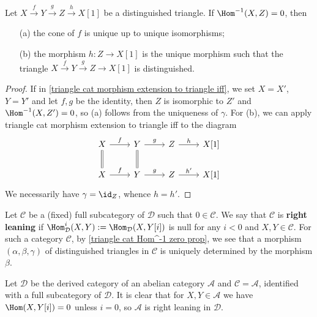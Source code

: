 \begin{corollary}\label{triangle cat Hom^-1 zero prop}
Let $X\stackrel{f}{\to} Y\stackrel{g}{\to} Z\stackrel{h}{\to} X[1]$ be a distinguished triangle. If $\Hom^{-1}(X,Z)=0$, then
\begin{enumerate}
    \item[(a)] the cone of $f$ is unique up to unique isomorphisms;
    \item[(b)] the morphism $h:Z\to X[1]$ is the unique morphism such that the triangle $X\stackrel{f}{\to} Y\stackrel{g}{\to} Z\to X[1]$ is distinguished. 
\end{enumerate}
\end{corollary}
\begin{proof}
If in \cref{triangle cat morphism extension to triangle iff}, we set $X=X'$, $Y=Y'$ and let $f,g$ be the identity, then $Z$ is isomorphic to $Z'$ and $\Hom^{-1}(X,Z')=0$, so (a) follows from the uniqueness of $\gamma$. For (b), we can apply {triangle cat morphism extension to triangle iff} to the diagram
\[\begin{tikzcd}
X\ar[r,"f"]\ar[d,equal]&Y\ar[r,"g"]\ar[d,equal]&Z\ar[r,"h"]&X[1]\\
X\ar[r,"f"]&Y\ar[r,"g"]&Z\ar[r,"h'"]&X[1]
\end{tikzcd}\]
We necessarily have $\gamma=\id_Z$, whence $h=h'$.
\end{proof}

Let $\mathcal{C}$ be a (fixed) full subcategory of $\mathcal{D}$ such that $0\in\mathcal{C}$. We say that $\mathcal{C}$ is \textbf{right leaning} if $\Hom^i_{\mathcal{D}}(X,Y):=\Hom_{\mathcal{D}}(X,Y[i])$ is null for any $i<0$ and $X,Y\in\mathcal{C}$. For such a category $\mathcal{C}$, by \cref{triangle cat Hom^-1 zero prop}, we see that a morphism $(\alpha,\beta,\gamma)$ of distinguished triangles in $\mathcal{C}$ is uniquely determined by the morphism $\beta$.
\begin{example}
Let $\mathcal{D}$ be the derived category of an abelian category $\mathcal{A}$ and $\mathcal{C}=\mathcal{A}$, identified with a full subcategory of $\mathcal{D}$. It is clear that for $X,Y\in\mathcal{A}$ we have $\Hom(X,Y[i])=0$ unless $i=0$, so $\mathcal{A}$ is right leaning in $\mathcal{D}$.
\end{example}

